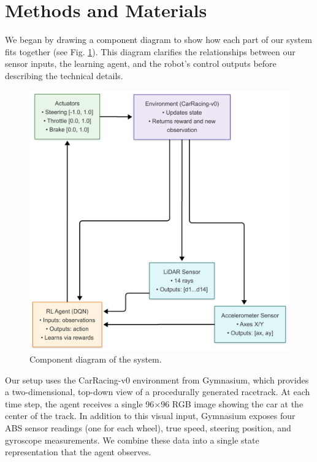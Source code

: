 \section{Methods and Materials}


We began by drawing a component diagram to show how each part of our system fits together (see Fig. \ref{fig:component_diagram}). This diagram clarifies the relationships between our sensor inputs, the learning agent, and the robot’s control outputs before describing the technical details.

\begin{figure}[h]
    \centering
    \includegraphics[width=0.8\linewidth]{images/ComponentDiagram.png}
    \caption{Component diagram of the system.}
    \label{fig:component_diagram}
\end{figure}

Our setup uses the CarRacing-v0 environment from Gymnasium, which provides a two-dimensional, top-down view of a procedurally generated racetrack. At each time step, the agent receives a single 96×96 RGB image showing the car at the center of the track. In addition to this visual input, Gymnasium exposes four ABS sensor readings (one for each wheel), true speed, steering position, and gyroscope measurements. We combine these data into a single state representation that the agent observes.

